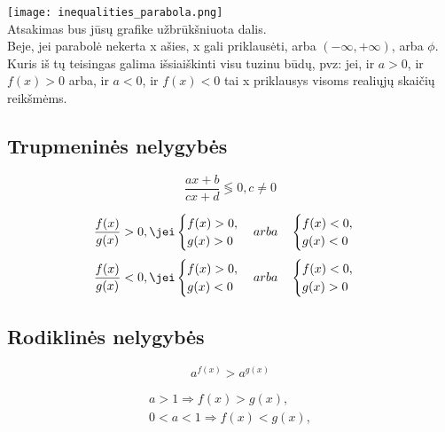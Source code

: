 \texttt{[image: inequalities\_parabola.png]}
\\
Atsakimas bus jūsų grafike užbrūkšniuota dalis.
\\
Beje, jei parabolė nekerta x ašies, x gali priklausėti, arba $(-\infty, +\infty)$, arba $\phi$. Kuris iš tų teisingas galima išsiaiškinti visu tuzinu būdų, pvz: jei, ir $a > 0$, ir $f(x) > 0$ arba, ir $a < 0$, ir $f(x) < 0$ tai x priklausys visoms realiųjų skaičių reikšmėms.


\subsection{Trupmeninės nelygybės}

\begin{equation}
    \frac{ax + b}{cx + d} \lessgtr 0, c \neq 0
\end{equation}

\begin{equation}
    \frac{f(x)}{g(x)} > 0, \jei 
    \begin{cases}
        f(x) > 0, \\
        g(x) > 0
    \end{cases} arba \quad
    \begin{cases}
        f(x) < 0, \\
        g(x) < 0
    \end{cases}
\end{equation}
\begin{equation}
    \frac{f(x)}{g(x)} < 0, \jei 
    \begin{cases}
        f(x) > 0, \\
        g(x) < 0
    \end{cases} arba \quad
    \begin{cases}
        f(x) < 0, \\
        g(x) > 0
    \end{cases} 
\end{equation}

\subsection{Rodiklinės nelygybės}

\begin{equation}
    a^{f(x)} > a^{g(x)}
\end{equation}

\begin{align}
    a > 1 \Rightarrow f(x) > g(x), \\
    0 < a < 1 \Rightarrow f(x) < g(x),
\end{align}

